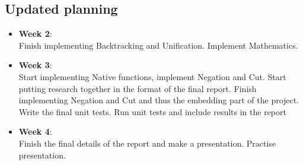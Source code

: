 \documentclass[a4paper]{article}
\begin{document}
\subsection*{Updated planning}
\begin{itemize}
\item \textbf{Week 2}:\\
Finish implementing Backtracking and Unification. Implement Mathematics.
\\
\item \textbf{Week 3}:\\
Start implementing Native functions, implement Negation and Cut.
Start putting research together in the format of the final report.
Finish implementing Negation and Cut and thus the embedding part of the project.
Write the final unit tests.
Run unit tests and include results in the report
\\
\item \textbf{Week 4}:\\
Finish the final details of the report and make a presentation. Practise presentation.
\end{itemize}
\end{document}
